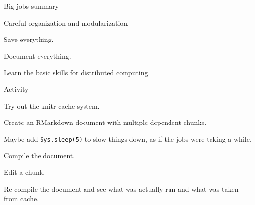 \documentclass[12pt,t]{beamer}
\begin{document}
\begin{frame}{Big jobs summary}

\bbi
\item Careful organization and modularization.
\item Save everything.
\item Document everything.
\item Learn the basic skills for distributed computing.
\ei

\end{frame}



\begin{frame}[c]{Activity}

Try out the knitr cache system.

  \bi
      \item Create an RMarkdown document with multiple dependent
        chunks.
      \item Maybe add {\tt Sys.sleep(5)} to slow things down, as if
        the jobs were taking a while.
      \item Compile the document.
      \item Edit a chunk.
      \item Re-compile the document and see what was actually run and
        what was taken from cache.
  \ei


\end{frame}
\end{document}

